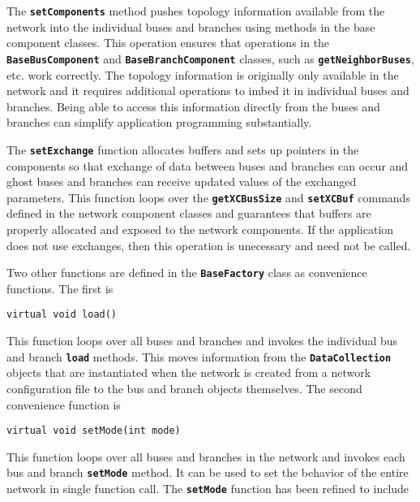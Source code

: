 The \texttt{\textbf{setComponents}} method pushes topology information available
from the network into the individual buses and branches using methods in the
base component classes. This operation ensures that operations in the
\texttt{\textbf{BaseBusComponent}} and \texttt{\textbf{BaseBranchComponent}}
classes, such as \texttt{\textbf{getNeighborBuses}}, etc. work correctly. The topology information is originally only available in the network and it requires additional operations to imbed it in individual buses and branches. Being able to access this information directly from the buses and branches can simplify application programming substantially.

The \texttt{\textbf{setExchange}} function allocates buffers and sets up
pointers in the components so that exchange of data between buses and branches
can occur and ghost buses and branches can receive updated values of the
exchanged parameters. This function loops over the
\texttt{\textbf{getXCBusSize}} and \texttt{\textbf{setXCBuf}} commands defined
in the network component classes and guarantees that buffers are properly
allocated and exposed to the network components. If the application does not use
exchanges, then this operation is unecessary and need not be called.

Two other functions are defined in the \texttt{\textbf{BaseFactory}} class as convenience functions. The first is

{
\color{red}
\begin{Verbatim}[fontseries=b]
virtual void load()
\end{Verbatim}
}

This function loops over all buses and branches and invokes the individual bus and branch \texttt{\textbf{load}} methods. This moves information from the \texttt{\textbf{DataCollection}} objects that are instantiated when the network is created from a network configuration file to the bus and branch objects themselves. The second convenience function is

{
\color{red}
\begin{Verbatim}[fontseries=b]
virtual void setMode(int mode)
\end{Verbatim}
}


This function loops over all buses and branches in the network and invokes each bus and branch \texttt{\textbf{setMode}} method. It can be used to set the behavior of the entire network in single function call.
The \texttt{\textbf{setMode}} function has been refined to include

